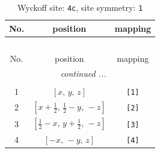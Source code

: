 \documentclass[fleqn,8pt]{jsarticle}
\begin{document}
\begin{longtable}{ccc}
\caption{Wyckoff site: {\tt 4c}, site symmetry: {\tt 1}}
 \\
 \hline \hline
No. & position & mapping \\ \hline \endfirsthead

\multicolumn{2}{l}{\tablename\ \thetable{}} \\
 \hline \hline
No. & position & mapping \\ \hline \endhead

 \hline \hline
\multicolumn{2}{r}{\footnotesize\it continued ...} \\ \endfoot

 \hline \hline
\multicolumn{2}{r}{} \\ \endlastfoot

1 & $\left[ x,\, y,\, z \right]$ & {\tt [1]} \\ \hline
2 & $\left[ x + \frac{1}{2},\, \frac{1}{2} - y,\, - z \right]$ & {\tt [2]} \\ \hline
3 & $\left[ \frac{1}{2} - x,\, y + \frac{1}{2},\, - z \right]$ & {\tt [3]} \\ \hline
4 & $\left[ - x,\, - y,\, z \right]$ & {\tt [4]} \\
\end{longtable}
\end{document}

